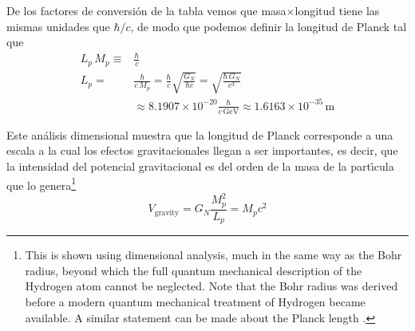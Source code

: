 De los factores de conversi\'on de la tabla vemos que masa$\times$longitud tiene las mismas unidades que $\hbar/c$, de modo que podemos definir la longitud de Planck tal que
\begin{align}
  L_p\,M_p\equiv&\frac{\hbar}{c}\nonumber\\
  L_p=&\frac{\hbar}{c\,M_p}=\frac{\hbar}{c}\sqrt{\frac{G_N}{\hbar c}}=\sqrt{\frac{\hbar\, G_N}{c^3}}\nonumber\\
  &\approx8.1907\times10^{-20}\frac{\hbar}{c\,\text{GeV}} \approx1.6163\times10^{-35}\,\text{m}
\end{align}

Este an\'alisis dimensional muestra que la longitud de Planck corresponde a una escala a la cual los efectos gravitacionales llegan a ser importantes, es decir, que la intensidad del potencial gravitacional es del orden de la masa de la part\'\i cula que lo genera\footnote{This is shown using dimensional analysis, much in the same
way as the Bohr radius, beyond which the full quantum mechanical
description of the Hydrogen atom cannot be neglected. Note that the
Bohr radius was derived before a modern quantum mechanical treatment
of Hydrogen became available. A similar statement can be made about
the Planck length \cite{andim}.}
\begin{equation}
  \label{eq:241}
  V_{\text{gravity}}=G_N\frac{M_p^2}{L_p}=M_pc^2
\end{equation}


